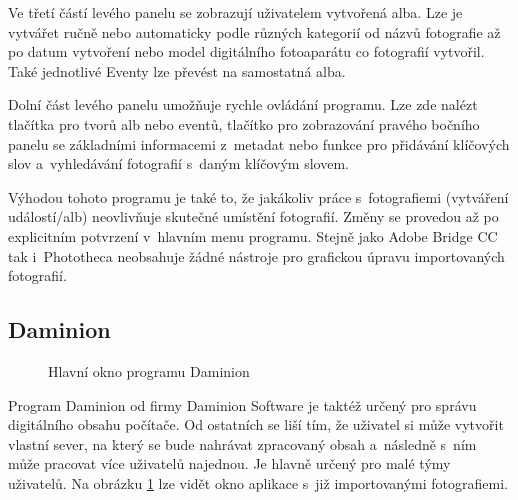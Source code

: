 Ve třetí částí levého panelu se zobrazují uživatelem vytvořená alba. Lze je vytvářet ručně nebo automaticky podle různých kategorií od názvů fotografie až po datum vytvoření nebo model digitálního fotoaparátu co fotografií vytvořil. Také jednotlivé Eventy lze převést na samostatná alba.

Dolní část levého panelu umožňuje rychle ovládání programu. Lze zde nalézt tlačítka pro tvorů alb nebo eventů, tlačítko pro zobrazování pravého bočního panelu se základními informacemi z~metadat nebo funkce pro přidávání klíčových slov a~vyhledávání fotografií s~daným klíčovým slovem.

Výhodou tohoto programu je také to, že jakákoliv práce s~fotografiemi (vytváření událostí/alb) neovlivňuje skutečné umístění fotografií. Změny se provedou až po explicitním potvrzení v~hlavním menu programu.
Stejně jako Adobe Bridge CC tak i~Phototheca neobsahuje žádné nástroje pro grafickou úpravu importovaných fotografií.



\subsection*{Daminion}

\begin{figure}[h!]
\begin{center}
\caption{Hlavní okno programu Daminion}
\label{daminion_ob}
\end{center}
\end{figure}

Program Daminion od firmy Daminion Software \cite{Daminion} je taktéž určený pro správu digitálního obsahu počítače. Od ostatních se liší tím, že uživatel si může vytvořit vlastní sever, na který se bude nahrávat zpracovaný obsah a~následně s~ním může pracovat více uživatelů najednou. Je hlavně určený pro malé týmy uživatelů. Na obrázku \ref{daminion_ob} lze vidět okno aplikace s~již importovanými fotografiemi.

